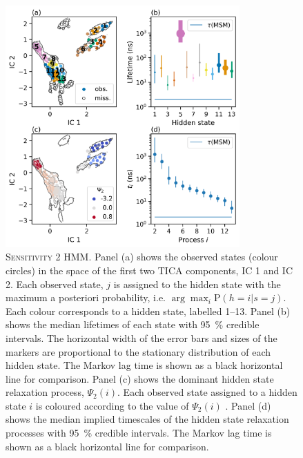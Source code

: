 \begin{figure}
    \centering
    \includegraphics[width=0.8\textwidth]{chapters/aadh/figures/sensitivity_2_hmm.png}
    \caption[Sensitivity 2 HMM]{\textsc{Sensitivity 2 HMM}.  Panel (a) shows the observed states (colour circles) in the space of the first two TICA components, IC 1 and IC 2. Each observed state, $j$ is assigned to the hidden state with the maximum a posteriori probability, i.e.  $\arg \max_{i} \mathrm{P}(h=i|s=j)$. Each colour corresponds to a hidden state, labelled \numrange{1}{13}. Panel (b) shows the median lifetimes of each state with \SI{95}{\percent} credible intervals. The horizontal width of the error bars and sizes of the markers are proportional to the stationary distribution of each hidden state. The Markov lag time is shown as a black horizontal line for comparison. Panel (c) shows the dominant hidden state relaxation process, $\Psi_{2}(i)$. Each observed state assigned to a hidden state $i$ is coloured according to the value of $\Psi_{2}(i)$ . Panel (d) shows the median implied timescales of the hidden state relaxation processes with \SI{95}{\percent} credible intervals. The Markov lag time is shown as a black horizontal line for comparison. }
    \label{fig:sensitivity_2_bhmm}
\end{figure}

